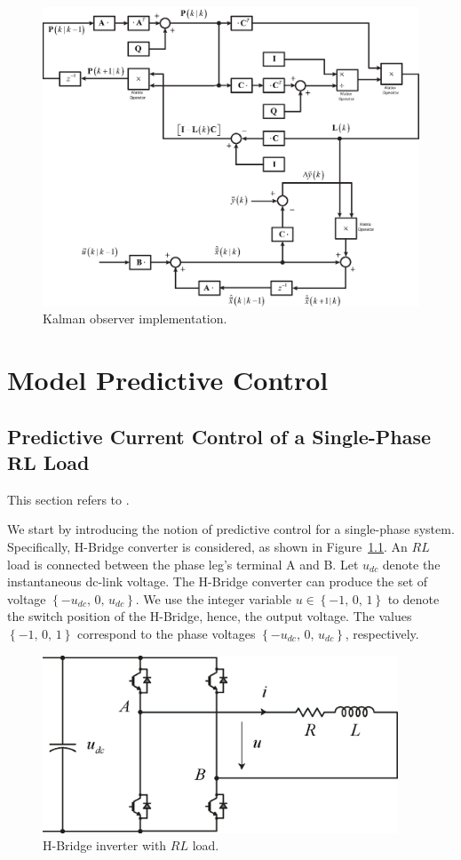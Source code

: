 \documentclass[11pt,a4paper,oneside]{book}
\numberwithin{equation}{section}
\theoremstyle{it}
\theoremstyle{definition}
\begin{document}
\begin{figure}[H]
	\centering
	\includegraphics[width = 440pt, angle=0, 
	keepaspectratio]{figures/kalman/kalman_2.eps}
	\caption{Kalman observer implementation.}
	\label{kalman}
\end{figure}

\chapter{Model Predictive Control} 
\section{Predictive Current Control of a Single-Phase $\mathit{\mathbf{RL}}$ 
Load} 
This section refers to  \cite{geyer}.

We start by introducing the notion of predictive control for a single-phase 
system. Specifically, H-Bridge converter is considered, as shown in 
Figure~\ref{fig:RLcircuit}. An $RL$ load is connected between the phase leg's 
terminal A and B. Let $u_{dc}$ denote the instantaneous dc-link voltage. The 
H-Bridge converter can produce the set of voltage $\left\lbrace 
-u_{dc},\,0,\,u_{dc}\right\rbrace $. We use the integer variable $u \in 
\left\lbrace -1,\,0,\,1\right\rbrace $ to denote the switch position of the 
H-Bridge, hence, the output voltage. The values $\left\lbrace 
-1,\,0,\,1\right\rbrace$ correspond to the phase voltages $\left\lbrace 
-u_{dc},\,0,\,u_{dc}\right\rbrace $, respectively.
\begin{figure}[H]
	\centering
	\includegraphics[width = 300pt, 
	keepaspectratio]{figures/mpc/mpc_rl_load_circuit.eps}
	\captionsetup{width=.5\textwidth}
	\caption{H-Bridge inverter with $RL$ load.}
	\label{fig:RLcircuit}
\end{figure}
\end{document}
